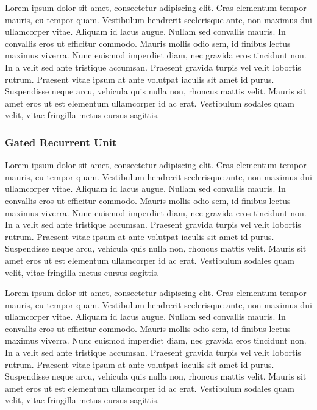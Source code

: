 \documentclass[conference]{IEEEtran}
\begin{document}
Lorem ipsum dolor sit amet, consectetur adipiscing elit. Cras elementum tempor mauris, eu tempor quam. Vestibulum hendrerit scelerisque ante, non maximus dui ullamcorper vitae. Aliquam id lacus augue. Nullam sed convallis mauris. In convallis eros ut efficitur commodo. Mauris mollis odio sem, id finibus lectus maximus viverra. Nunc euismod imperdiet diam, nec gravida eros tincidunt non. In a velit sed ante tristique accumsan. Praesent gravida turpis vel velit lobortis rutrum. Praesent vitae ipsum at ante volutpat iaculis sit amet id purus. Suspendisse neque arcu, vehicula quis nulla non, rhoncus mattis velit. Mauris sit amet eros ut est elementum ullamcorper id ac erat. Vestibulum sodales quam velit, vitae fringilla metus cursus sagittis.

\subsubsection{Gated Recurrent Unit}

Lorem ipsum dolor sit amet, consectetur adipiscing elit. Cras elementum tempor mauris, eu tempor quam. Vestibulum hendrerit scelerisque ante, non maximus dui ullamcorper vitae. Aliquam id lacus augue. Nullam sed convallis mauris. In convallis eros ut efficitur commodo. Mauris mollis odio sem, id finibus lectus maximus viverra. Nunc euismod imperdiet diam, nec gravida eros tincidunt non. In a velit sed ante tristique accumsan. Praesent gravida turpis vel velit lobortis rutrum. Praesent vitae ipsum at ante volutpat iaculis sit amet id purus. Suspendisse neque arcu, vehicula quis nulla non, rhoncus mattis velit. Mauris sit amet eros ut est elementum ullamcorper id ac erat. Vestibulum sodales quam velit, vitae fringilla metus cursus sagittis.

Lorem ipsum dolor sit amet, consectetur adipiscing elit. Cras elementum tempor mauris, eu tempor quam. Vestibulum hendrerit scelerisque ante, non maximus dui ullamcorper vitae. Aliquam id lacus augue. Nullam sed convallis mauris. In convallis eros ut efficitur commodo. Mauris mollis odio sem, id finibus lectus maximus viverra. Nunc euismod imperdiet diam, nec gravida eros tincidunt non. In a velit sed ante tristique accumsan. Praesent gravida turpis vel velit lobortis rutrum. Praesent vitae ipsum at ante volutpat iaculis sit amet id purus. Suspendisse neque arcu, vehicula quis nulla non, rhoncus mattis velit. Mauris sit amet eros ut est elementum ullamcorper id ac erat. Vestibulum sodales quam velit, vitae fringilla metus cursus sagittis.
\end{document}
